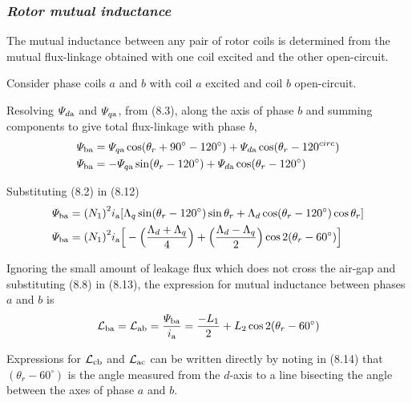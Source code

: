 \documentclass[a4paper,numbers=noenddot,12pt]{scrbook}
\begin{document}
    \subsubsection{\textit{Rotor mutual inductance}}
    The mutual inductance between any pair of rotor coils is determined from the mutual flux-linkage obtained with one coil excited and the other open-circuit.

    Consider phase coils $a$ and $b$ with coil $a$ excited and coil $b$ open-circuit.

    Resolving $\varPsi_{d\textup{a}}$ and $\varPsi_{q\textup{a}}$, from (8.3), along the axis of phase $b$ and summing components to give total flux-linkage with phase $b$,
    \begin{align}
        \varPsi_{\textup{ba}} & = \varPsi_{q\textup{a}} \cos (\theta_r + 90^{\circ} -120^{\circ}) +\varPsi_{d\textup{a}} \cos(\theta_r - 120^{circ}) \nonumber \\
        \varPsi_{\textup{ba}} & = -\varPsi_{q\textup{a}} \sin (\theta_r - 120^{\circ}) + \varPsi_{d\textup{a}} \cos(\theta_r -120^{\circ}) 
        \label{eq:Eq8.12}
    \end{align}

    Substituting (8.2) in (8.12)
    \begin{align}
        \varPsi_{\textup{ba}} & = {(N_1)}^2 i_{\textup{a}}[\Lambda_q \sin(\theta_r -120^{\circ}) \sin \theta_r + \Lambda_d \cos(\theta_r -120^{\circ}) \cos \theta_r] \nonumber \\
        \varPsi_{\textup{ba}} & = {(N_1)}^2 i_{\textup{a}} \Big[ - \Big( \dfrac{\Lambda_d + \Lambda_q}{4} \Big) + \Big( \dfrac{\Lambda_d - \Lambda_q}{2}\Big) \cos 2(\theta_r - 60^{\circ})\Big]
        \label{eq:Eq8.13}
    \end{align}

    Ignoring the small amount of leakage flux which does not cross the air-gap and substituting (8.8) in (8.13), the expression for mutual inductance between phases $a$ and $b$ is
    \begin{equation}
        \mathcal{L}_{\textup{ba}} = \mathcal{L}_{\textup{ab}} = \dfrac{\varPsi_{\textup{ba}}}{i_{\textup{a}}} = \dfrac{-L_1}{2} + L_2 \cos 2(\theta_r - 60^{\circ})
        \label{eq:Eq8.14}
    \end{equation}

    Expressions for $\mathcal{L}_{\textup{cb}}$ and $\mathcal{L}_{\textup{ac}}$ can be written directly by noting in (8.14) that $(\theta_r - 60^{\circ})$ is the angle measured from the $d$-axis to a line bisecting the angle between the axes of phase $a$ and $b$.
\end{document}
